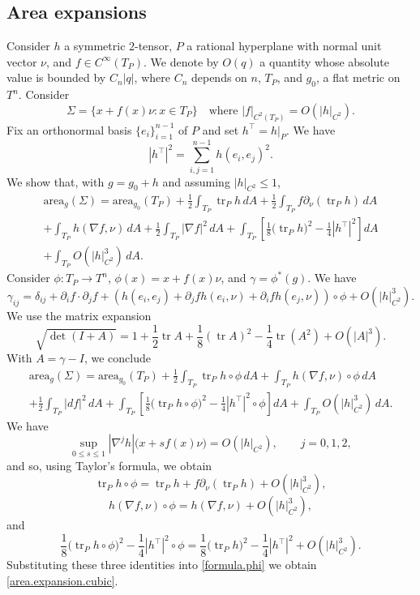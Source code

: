 \documentclass[11pt]{amsart}
\def\tr{\operatorname{tr}}
\theoremstyle{remark}
\theoremstyle{definition}
\begin{document}
	{
		\subsection{Area expansions}\label{area.expansion.appendix} Consider $h$ a symmetric $2$-tensor, $P$ a rational hyperplane with normal unit vector $\nu$, and $f\in C^{\infty}(T_P)$.  We denote by $O(q)$ a quantity whose absolute value is bounded by $C_n|q|$, where $C_n$ depends on $n$, $T_P$, and $g_0$, a flat metric on $T^n$.  Consider
		$$\Sigma=\{x+f(x)\nu:x\in T_P\}\quad\text{where }|f|_{C^2(T_P)}=O(|h|_{C^2}).$$
		Fix an orthonormal basis $\{e_i\}_{i=1}^{n-1}$ of $P$ and set $h^\top=h|_{P}$. We have 
		$$|h^\top|^2=\sum_{i,j=1}^{n-1} h(e_i,e_j)^2.$$
		We show that, with $g=g_0+h$ and assuming $|h|_{C^2}\leq 1$,
		\begin{multline}\label{area.expansion.cubic}
			\text{area}_g(\Sigma)=\text{area}_{g_0}(T_P)+\frac12\int_{T_P}\tr _P h\,dA+\frac12\int_{T_P}f\partial_\nu(\tr _P h)\,dA\\
			+\int_{T_P}h(\nabla f,\nu)\,dA+\frac12\int_{T_P}|\nabla f|^2\,dA
			+\int_{T_P}\left[\frac18\bigl(\tr _P h\bigr)^2-\frac14|h^\top|^2\right]dA\\+\int_{T_P}O(|h|^3_{C^2})\,dA.
		\end{multline}
		Consider $\phi:T_P\rightarrow T^n$, $\phi(x)=x+f(x)\nu$, and $\gamma=\phi^*(g)$. We have
		$$
		\gamma_{ij}=\delta_{ij}+\partial_if\cdot\partial_jf+\left(h(e_i,e_j)+\partial_jfh(e_i,\nu)+\partial_ifh(e_j,\nu)\right)\circ\phi+O(|h|^3_{C^2}).
		$$
		We use the matrix expansion
		$$
		\sqrt{\det(I+A)}=1+\frac12\tr A+\frac18(\tr A)^2-\frac14\tr (A^2)+O(|A|^3).
		$$
		With $A=\gamma-I$, we conclude 
		\begin{multline}\label{formula.phi}
			\text{area}_g(\Sigma)=\text{area}_{g_0}(T_P)+\frac12\int_{T_P}\tr _P h\circ\phi\,dA+\int_{T_P}h(\nabla f,\nu)\circ\phi\,dA\\
			+\frac12\int_{T_P}|df|^2\,dA+\int_{T_P}\left[\frac18\bigl(\tr _P h\circ\phi\bigr)^2-\frac14|h^\top|^2\circ\phi\right]dA+\int_{T_P}O(|h|^3_{C^2})\,dA.
		\end{multline}
		We have
		$$
		\sup_{0\leq s\leq 1}|\nabla^jh|\bigl(x+sf(x)\nu\bigr)=O(|h|_{C^2}),\qquad j=0,1,2,
		$$
		and so, using Taylor's formula, we obtain
		$$
		\tr _P h\circ\phi=\tr _P h+f\partial_\nu(\tr _P h)+O(|h|^3_{C^2}),
		$$
		$$
		h(\nabla f,\nu)\circ\phi=h(\nabla f,\nu)+O(|h|^3_{C^2}),
		$$
		and
		$$
		\frac18\bigl(\tr _P h\circ\phi\bigr)^2-\frac14|h^\top|^2\circ\phi=\frac18\bigl(\tr _P h\bigr)^2-\frac14|h^\top|^2+O(|h|^3_{C^2}).
		$$
		Substituting these three identities into \eqref{formula.phi} we obtain \eqref{area.expansion.cubic}.}
\end{document}

